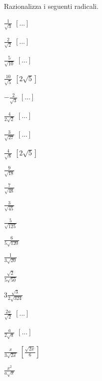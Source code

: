 \begin{esercizio}[\Ast]
 \label{ese:2.68}
Razionalizza i seguenti radicali.
 \begin{multicols}{4}
 \begin{enumeratea}
 \item $\frac 1{\sqrt 3}$
  \hfill $\left[...\right]$
 \item $\frac 2{\sqrt 2}$
  \hfill $\left[...\right]$
 \item $\frac 5{\sqrt{10}}$
  \hfill $\left[...\right]$
 \item $\frac{10}{\sqrt 5}$
  \hfill $\left[2\sqrt 5\right]$
 \item $-\frac 2{\sqrt 3}$
  \hfill $\left[...\right]$
 \item $\frac 4{2\sqrt 2}$
  \hfill $\left[...\right]$
 \item $\frac 3{\sqrt{27}}$
  \hfill $\left[...\right]$
 \item $\frac 4{\sqrt 8}$
  \hfill $\left[2\sqrt 5\right]$
 \item $\frac 9{\sqrt{18}}$
 \item $\frac 7{\sqrt{48}}$
 \item $\frac 3{\sqrt{45}}$
 \item $\frac 5{\sqrt{125}}$
 \item $\frac 6{5\sqrt{120}}$
 \item $\frac 1{3\sqrt{20}}$
 \item $\frac{\sqrt 2}{5\sqrt{50}}$
 \item $3\frac{\sqrt 3}{2\sqrt{324}}$
 \item $\frac{2a}{\sqrt 2}$
  \hfill $\left[...\right]$
 \item $\frac a{2\sqrt a}$
  \hfill $\left[...\right]$
 \item $\frac x{3\sqrt{2x}}$
  \hfill $\left[\frac{\sqrt{2x}} 6\right]$
 \item $\frac{x^2}{a\sqrt x}$

\end{enumeratea}
\end{multicols}
\end{esercizio}
